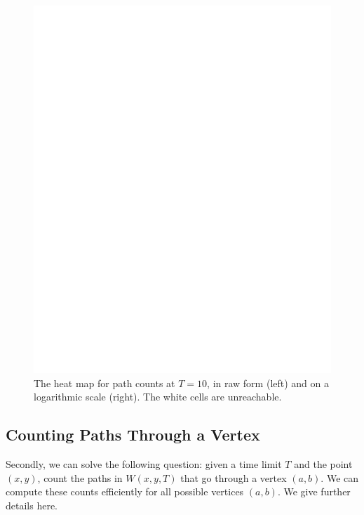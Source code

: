 \documentclass[11pt,a4paper,twoside,british]{article}
\begin{document}
\begin{figure}
\includegraphics{dummy.png}
\caption{The heat map for path counts at $T = 10$, in raw form (left) and on a
logarithmic scale (right).
The white cells are unreachable.}
\label{fig:paths_dp}
\end{figure}

\subsection{Counting Paths Through a Vertex}
Secondly, we can solve the following question: given a time limit $T$ and the
point $(x, y)$, count the paths in $W(x, y, T)$ that go through a vertex
$(a, b)$.
We can compute these counts efficiently for all possible vertices $(a, b)$.
We give further details here.
\end{document}
